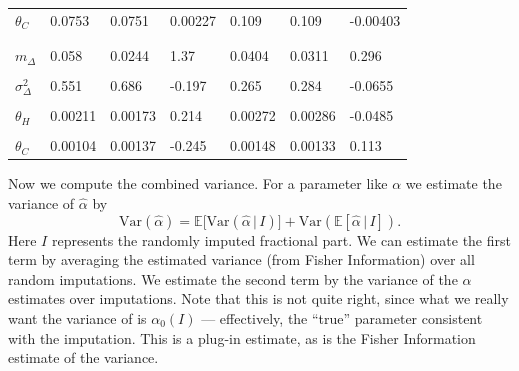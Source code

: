 \documentclass[
]{article}
\begin{document}
\begin{table}[!h]
\begin{tabular}[t]{lllllll}
\hspace{1em}$\theta_C$ & 0.0753 & 0.0751 & 0.00227 & 0.109 & 0.109 & -0.00403\\
\addlinespace[0.3em]
\multicolumn{7}{l}{\textbf{Parameter SE estimates}}\\
\cellcolor{gray!10}{\hspace{1em}$m_M$} & \cellcolor{gray!10}{0.161} & \cellcolor{gray!10}{0.167} & \cellcolor{gray!10}{-0.0352} & \cellcolor{gray!10}{0.0851} & \cellcolor{gray!10}{0.0768} & \cellcolor{gray!10}{0.109}\\
\hspace{1em}$m_\Delta$ & 0.058 & 0.0244 & 1.37 & 0.0404 & 0.0311 & 0.296\\
\cellcolor{gray!10}{\hspace{1em}$\sigma^2_M$} & \cellcolor{gray!10}{4.41} & \cellcolor{gray!10}{3.32} & \cellcolor{gray!10}{0.325} & \cellcolor{gray!10}{1.22} & \cellcolor{gray!10}{1.42} & \cellcolor{gray!10}{-0.139}\\
\hspace{1em}$\sigma^2_\Delta$ & 0.551 & 0.686 & -0.197 & 0.265 & 0.284 & -0.0655\\
\cellcolor{gray!10}{\hspace{1em}$\alpha_H$} & \cellcolor{gray!10}{0.0568} & \cellcolor{gray!10}{0.0488} & \cellcolor{gray!10}{0.166} & \cellcolor{gray!10}{0.0633} & \cellcolor{gray!10}{0.0634} & \cellcolor{gray!10}{-0.00127}\\
\hspace{1em}$\theta_H$ & 0.00211 & 0.00173 & 0.214 & 0.00272 & 0.00286 & -0.0485\\
\cellcolor{gray!10}{\hspace{1em}$\alpha_C$} & \cellcolor{gray!10}{0.0769} & \cellcolor{gray!10}{0.104} & \cellcolor{gray!10}{-0.258} & \cellcolor{gray!10}{0.087} & \cellcolor{gray!10}{0.0534} & \cellcolor{gray!10}{0.628}\\
\hspace{1em}$\theta_C$ & 0.00104 & 0.00137 & -0.245 & 0.00148 & 0.00133 & 0.113\\
\bottomrule
\end{tabular}
\end{table}

Now we compute the combined variance. For a parameter like \(\alpha\) we estimate the variance of \(\hat\alpha\) by
\newcommand{\E}{\mathbb{E}}
\renewcommand{\P}{\mathbb{P}}
\[
  \mathrm{Var}(\hat\alpha) = \mathbb{E}\bigl[ \mathrm{Var}\left(\hat\alpha\, |\, I\right)\bigr] + \mathrm{Var}\left(\mathbb{E} \left[ \hat\alpha\, |\, I \right]\right).
\]
Here \(I\) represents the randomly imputed fractional part.
We can estimate the first term by averaging the estimated variance (from Fisher Information) over all random imputations.
We estimate the second term by the variance of the \(\alpha\) estimates over imputations. Note that this is not quite right, since what we really
want the variance of is \(\alpha_0(I)\) --- effectively, the ``true'' parameter consistent with the imputation. This is a plug-in estimate,
as is the Fisher Information estimate of the variance.
\end{document}
